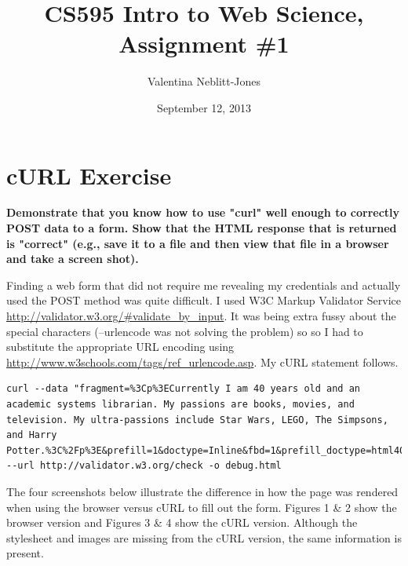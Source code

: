 \documentclass{article}
\begin{document}
\title{CS595 Intro to Web Science, Assignment \#1}
\author{Valentina Neblitt-Jones}
\date{September 12, 2013}
\maketitle

\section{cURL Exercise}
\textbf {Demonstrate that you know how to use "curl" well enough to correctly POST data to a form.  Show that the HTML response that is returned is "correct" (e.g., save it to a file and then view that file in a browser and take a screen shot).}

Finding a web form that did not require me revealing my credentials and actually used the POST method was quite difficult. I used W3C Markup Validator Service \url{http://validator.w3.org/#validate_by_input}. It was being extra fussy about the special characters (--urlencode was not solving the problem) so so I had to substitute the appropriate URL encoding using \url{http://www.w3schools.com/tags/ref_urlencode.asp}. My cURL statement follows.

\begin{lstlisting}
curl --data "fragment=%3Cp%3ECurrently I am 40 years old and an academic systems librarian. My passions are books, movies, and television. My ultra-passions include Star Wars, LEGO, The Simpsons, and Harry Potter.%3C%2Fp%3E&prefill=1&doctype=Inline&fbd=1&prefill_doctype=html401&group=0&ss=1&st=1&outline=1&No200=1&verbose=1" --url http://validator.w3.org/check -o debug.html
\end{lstlisting}

The four screenshots below illustrate the difference in how the page was rendered when using the browser versus cURL to fill out the form. Figures 1 \& 2 show the browser version and Figures 3 \& 4 show the cURL version. Although the stylesheet and images are missing from the cURL version, the same information is present.
\end{document}
